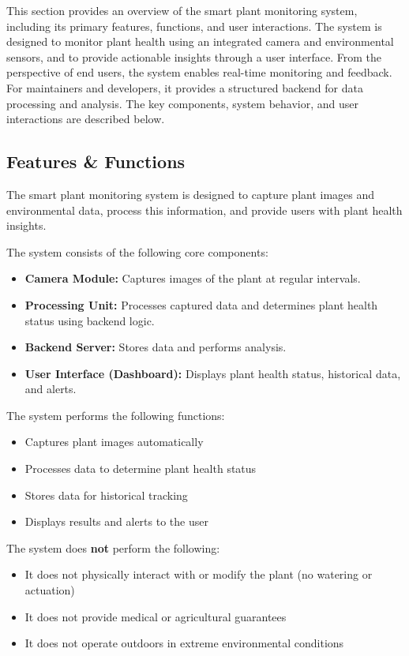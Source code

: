 This section provides an overview of the smart plant monitoring system, including its primary features, functions, and user interactions. The system is designed to monitor plant health using an integrated camera and environmental sensors, and to provide actionable insights through a user interface. From the perspective of end users, the system enables real-time monitoring and feedback. For maintainers and developers, it provides a structured backend for data processing and analysis. The key components, system behavior, and user interactions are described below.

\subsection{Features \& Functions}

The smart plant monitoring system is designed to capture plant images and environmental data, process this information, and provide users with plant health insights.

The system consists of the following core components:
\begin{itemize}
    \item \textbf{Camera Module:} Captures images of the plant at regular intervals.
    \item \textbf{Processing Unit:} Processes captured data and determines plant health status using backend logic.
    \item \textbf{Backend Server:} Stores data and performs analysis.
    \item \textbf{User Interface (Dashboard):} Displays plant health status, historical data, and alerts.
\end{itemize}

The system performs the following functions:
\begin{itemize}
    \item Captures plant images automatically
    \item Processes data to determine plant health status
    \item Stores data for historical tracking
    \item Displays results and alerts to the user
\end{itemize}

The system does \textbf{not} perform the following:
\begin{itemize}
    \item It does not physically interact with or modify the plant (no watering or actuation)
    \item It does not provide medical or agricultural guarantees
    \item It does not operate outdoors in extreme environmental conditions
\end{itemize}

